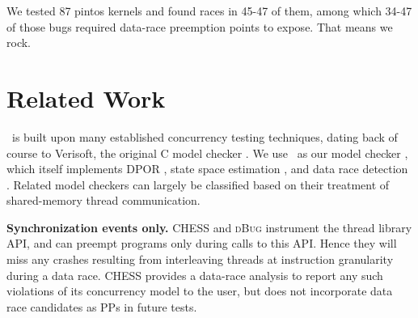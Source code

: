 \documentclass[pldi]{sigplanconf-pldi15}
\begin{document}
\begin{enumerate}



\end{enumerate}


We tested 87 pintos kernels and found races in 45-47 of them, among which 34-47 of those bugs required data-race preemption points to expose. That means we rock.



\section{Related Work}


\quicksand~is built upon many established concurrency testing techniques, dating back of course to Verisoft, the original C model checker \cite{verisoft}.
We use \landslide~as our model checker \cite{landslide},
which itself implements DPOR \cite{dpor},
state space estimation \cite{estimation},
and data race detection \cite{eraser}. Related model checkers can largely be classified based on their treatment of shared-memory thread communication.

{\bf Synchronization events only.} CHESS \cite{chess} and \textsc{dBug} \cite{dbug-ssv} instrument the thread library API, and can preempt programs only during calls to this API.
Hence they will miss any crashes resulting from interleaving threads at instruction granularity during a data race. CHESS provides a data-race analysis to report any such violations of its concurrency model to the user, but does not incorporate data race candidates as PPs in future tests.
\end{document}
